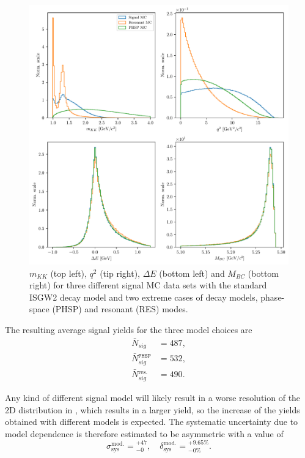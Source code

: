 \begin{figure}[!htb]
	\centering
	\captionsetup{width=0.8\linewidth}
	\includegraphics[width=\linewidth]{fig/model_cases}
	\caption{$m_{KK}$ (top left), $q^2$ (tip right), $\Delta E$ (bottom left) and $M_{BC}$ (bottom right) for three different signal MC data sets with the standard ISGW2 decay model and two extreme cases of decay models, phase-space (PHSP) and resonant (RES) modes.}
	\label{fig:model_cases}
\end{figure}

The resulting average signal yields for the three model choices are
\begin{align}
\bar N {}_{sig} &= 487, \\
\bar N {}_{sig}^{\mathtt{PHSP}} &= 532, \\
\bar N {}_{sig}^{\mathrm{res.}} &= 490.
\end{align}

Any kind of different signal model will likely result in a worse resolution of the 2D distribution in \vars, which results in a larger yield, so the increase of the yields obtained with different models is expected. The systematic uncertainty due to model dependence is therefore estimated to be asymmetric with a value of 
\begin{equation}
\sigma_{\mathrm{sys}}^{\mathrm{mod.}} = {}^{+47}_{-0},\quad \delta_{\mathrm{sys}}^{\mathrm{mod.}} = {}^{+9.65\%}_{-0\%}.
\end{equation}

